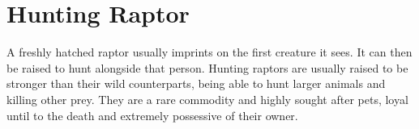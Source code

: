 \section{Hunting Raptor}

A freshly hatched raptor usually imprints on the first creature it sees. It can then be raised to hunt alongside that person. Hunting raptors are usually raised to be stronger than their wild counterparts, being able to hunt larger animals and killing other prey. They are a rare commodity and highly sought after pets, loyal until to the death and extremely possessive of their owner.
